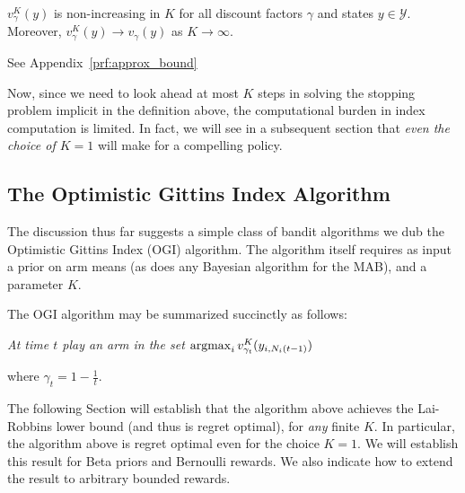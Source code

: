 \begin{lemma} \label{lemma:approx_bound}
$v_\gamma^{K}(y)$ is non-increasing in $K$ for all discount factors $\gamma$ and states $y \in \mathcal Y$.
Moreover, $v^K_\gamma(y) \to v_\gamma(y)$ as $K \to \infty$.	
\end{lemma}
\begin{myproof}[Proof]
	See Appendix~\ref{prf:approx_bound}
\end{myproof}

Now, since we need to look ahead at most $K$ steps in solving the stopping problem implicit in the definition above, the computational burden in index computation is limited. In fact, we will see in a subsequent section that {\em even the choice of $K=1$} will make for a compelling policy. 


\subsection{The Optimistic Gittins Index Algorithm}

The discussion thus far suggests a simple class of bandit algorithms we dub the Optimistic Gittins Index (OGI) algorithm. The algorithm itself requires as input a prior on arm means (as does any Bayesian algorithm for the MAB), and a parameter $K$. 


\noindent The OGI algorithm may be summarized succinctly as follows:

\begin{center}
{\em At time $t$ play an arm in the set $\operatorname*{\mathrm{argmax}}_i v^K_{\gamma_t}(y_{i,N_i(t-1)})$}
\end{center}

\noindent where $\gamma_t = 1 - \frac{1}{t}$. 

The following Section will establish that the algorithm above achieves the Lai-Robbins lower bound (and thus is regret optimal), for {\em any} finite $K$. In particular, the algorithm above is regret optimal even for the choice $K=1$. We will establish this result for Beta priors and Bernoulli rewards. We also indicate how to extend the result to arbitrary bounded rewards. 

